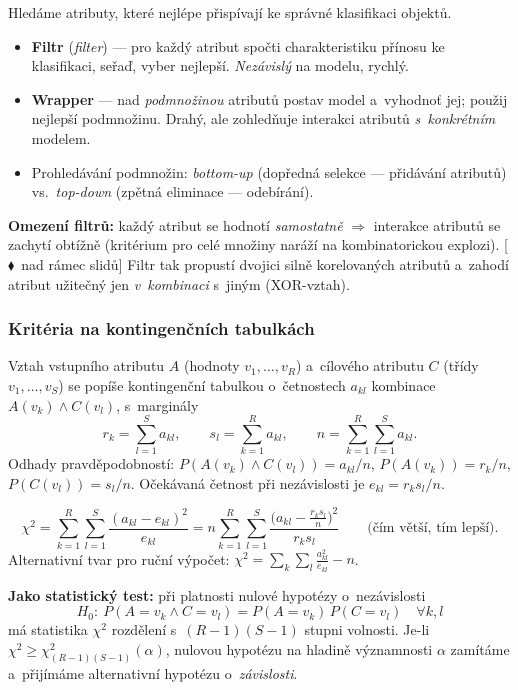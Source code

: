 \documentclass[11pt,a4paper]{article}
\theoremstyle{definition}
\newcommand{\mimo}{\textcolor{markcol}{\textsf{\footnotesize[$\blacklozenge$~nad rámec slidů]}}}
\begin{document}
Hledáme atributy, které nejlépe přispívají ke správné klasifikaci objektů.

\begin{defbox}
\begin{itemize}
\item \textbf{Filtr} (\emph{filter}) --- pro každý atribut spočti charakteristiku přínosu
      ke klasifikaci, seřaď, vyber nejlepší. \emph{Nezávislý} na modelu, rychlý.
\item \textbf{Wrapper} --- nad \emph{podmnožinou} atributů postav model a~vyhodnoť jej;
      použij nejlepší podmnožinu. Drahý, ale zohledňuje interakci atributů
      \emph{s~konkrétním} modelem.
\item Prohledávání podmnožin: \emph{bottom-up} (dopředná selekce --- přidávání atributů)
      vs.\ \emph{top-down} (zpětná eliminace --- odebírání).
\end{itemize}
\end{defbox}

\textbf{Omezení filtrů:} každý atribut se hodnotí \emph{samostatně} $\Rightarrow$ interakce
atributů se zachytí obtížně (kritérium pro celé množiny naráží na kombinatorickou explozi).
\mimo{} Filtr tak propustí dvojici silně korelovaných atributů a~zahodí atribut užitečný jen
\emph{v~kombinaci} s~jiným (XOR-vztah).

\subsubsection{Kritéria na kontingenčních tabulkách}
\label{ssec:kontingencni}

Vztah vstupního atributu $A$ (hodnoty $v_1,\dots,v_R$) a~cílového atributu $C$ (třídy
$v_1,\dots,v_S$) se popíše kontingenční tabulkou o~četnostech $a_{kl}$ kombinace
$A(v_k)\wedge C(v_l)$, s~marginály
\[ r_k=\sum_{l=1}^{S}a_{kl},\qquad s_l=\sum_{k=1}^{R}a_{kl},\qquad
n=\sum_{k=1}^{R}\sum_{l=1}^{S}a_{kl}. \]
Odhady pravděpodobností: $P(A(v_k)\wedge C(v_l))=a_{kl}/n$, $P(A(v_k))=r_k/n$,
$P(C(v_l))=s_l/n$. Očekávaná četnost při nezávislosti je $e_{kl}=r_k s_l/n$.

\begin{defbox}
\[ \chi^2=\sum_{k=1}^{R}\sum_{l=1}^{S}\frac{(a_{kl}-e_{kl})^2}{e_{kl}}
   = n\sum_{k=1}^{R}\sum_{l=1}^{S}\frac{\big(a_{kl}-\tfrac{r_ks_l}{n}\big)^2}{r_ks_l}
   \qquad\text{(čím větší, tím lepší).}\]
Alternativní tvar pro ruční výpočet: $\chi^2=\sum_k\sum_l \frac{a_{kl}^2}{e_{kl}}-n$.

\textbf{Jako statistický test:} při platnosti nulové hypotézy o~nezávislosti
\[ H_0:\ P(A=v_k\wedge C=v_l)=P(A=v_k)\,P(C=v_l)\quad \forall k,l \]
má statistika $\chi^2$ rozdělení s~$(R-1)(S-1)$ stupni volnosti. Je-li
$\chi^2\ge\chi^2_{(R-1)(S-1)}(\alpha)$, nulovou hypotézu na hladině významnosti $\alpha$
zamítáme a~přijímáme alternativní hypotézu o~\emph{závislosti}.
\end{defbox}
\end{document}
